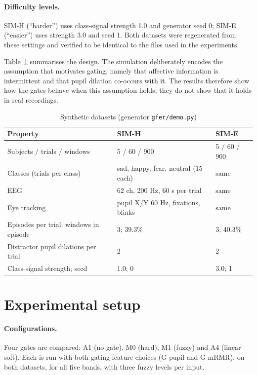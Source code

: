 \paragraph{Difficulty levels.} SIM-H (``harder'') uses class-signal strength 1.0 and generator seed 0; SIM-E (``easier'') uses strength 3.0 and seed 1. Both datasets were regenerated from these settings and verified to be identical to the files used in the experiments.

Table~\ref{tab:simdata} summarises the design. The simulation deliberately encodes the assumption that motivates gating, namely that affective information is intermittent and that pupil dilation co-occurs with it. The results therefore show how the gates behave when this assumption holds; they do not show that it holds in real recordings.

\begin{table}[t]
\centering\small
\caption{Synthetic datasets (generator \texttt{gfer/demo.py})}\label{tab:simdata}
\begin{tabular}{@{}lll@{}}
\toprule
Property & SIM-H & SIM-E\\
\midrule
Subjects / trials / windows & 5 / 60 / 900 & 5 / 60 / 900\\
Classes (trials per class) & sad, happy, fear, neutral (15 each) & same\\
EEG & 62 ch, 200 Hz, 60 s per trial & same\\
Eye tracking & pupil X/Y 60 Hz, fixations, blinks & same\\
Episodes per trial; windows in episode & 3; 39.3\% & 3; 40.3\%\\
Distractor pupil dilations per trial & 2 & 2\\
Class-signal strength; seed & 1.0; 0 & 3.0; 1\\
\bottomrule
\end{tabular}
\end{table}

\section{Experimental setup}
\label{sec:setup}

\paragraph{Configurations.} Four gates are compared: A1 (no gate), M0 (hard), M1 (fuzzy) and A4 (linear soft). Each is run with both gating-feature choices (G-pupil and G-mRMR), on both datasets, for all five bands, with three fuzzy levels per input.

